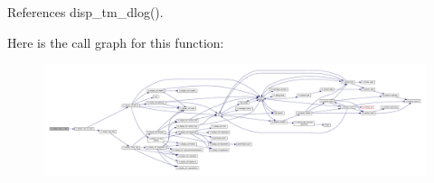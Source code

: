 References disp\+\_\+tm\+\_\+dlog().

Here is the call graph for this function\+:
\nopagebreak
\begin{figure}[H]
\begin{center}
\leavevmode
\includegraphics[width=350pt]{namespacem__display_ab6b5841935e6e08ce9d8a293f2e7c18a_cgraph}
\end{center}
\end{figure}
\mbox{\label{namespacem__display_a4930462636c070e8b4761167fadfd4f9}} 
